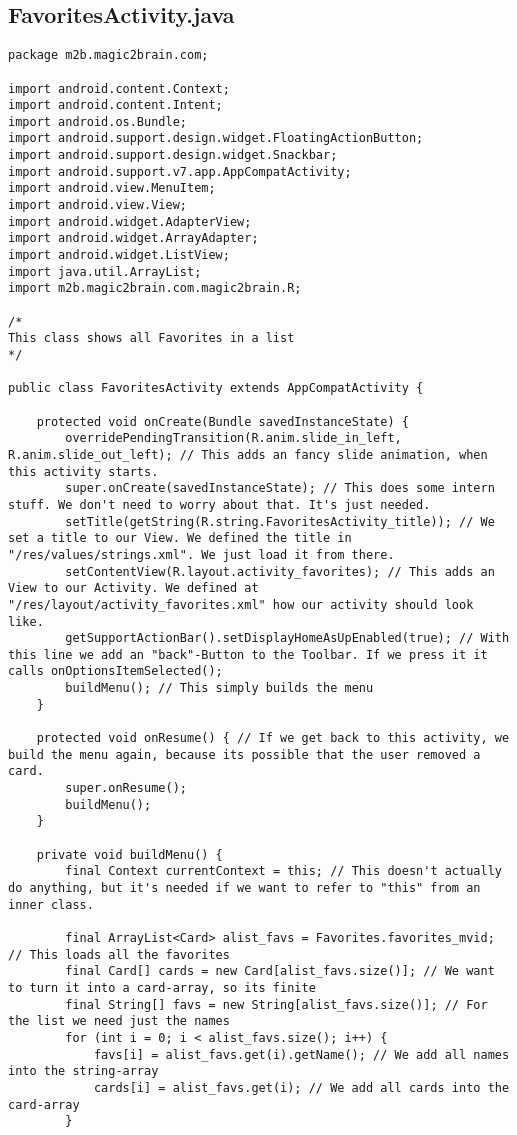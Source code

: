\subsection*{FavoritesActivity.java}
\begin{lstlisting}
package m2b.magic2brain.com;

import android.content.Context;
import android.content.Intent;
import android.os.Bundle;
import android.support.design.widget.FloatingActionButton;
import android.support.design.widget.Snackbar;
import android.support.v7.app.AppCompatActivity;
import android.view.MenuItem;
import android.view.View;
import android.widget.AdapterView;
import android.widget.ArrayAdapter;
import android.widget.ListView;
import java.util.ArrayList;
import m2b.magic2brain.com.magic2brain.R;

/*
This class shows all Favorites in a list
*/

public class FavoritesActivity extends AppCompatActivity {

    protected void onCreate(Bundle savedInstanceState) {
        overridePendingTransition(R.anim.slide_in_left, R.anim.slide_out_left); // This adds an fancy slide animation, when this activity starts.
        super.onCreate(savedInstanceState); // This does some intern stuff. We don't need to worry about that. It's just needed.
        setTitle(getString(R.string.FavoritesActivity_title)); // We set a title to our View. We defined the title in "/res/values/strings.xml". We just load it from there.
        setContentView(R.layout.activity_favorites); // This adds an View to our Activity. We defined at "/res/layout/activity_favorites.xml" how our activity should look like.
        getSupportActionBar().setDisplayHomeAsUpEnabled(true); // With this line we add an "back"-Button to the Toolbar. If we press it it calls onOptionsItemSelected();
        buildMenu(); // This simply builds the menu
    }

    protected void onResume() { // If we get back to this activity, we build the menu again, because its possible that the user removed a card.
        super.onResume();
        buildMenu();
    }

    private void buildMenu() {
        final Context currentContext = this; // This doesn't actually do anything, but it's needed if we want to refer to "this" from an inner class.

        final ArrayList<Card> alist_favs = Favorites.favorites_mvid; // This loads all the favorites
        final Card[] cards = new Card[alist_favs.size()]; // We want to turn it into a card-array, so its finite
        final String[] favs = new String[alist_favs.size()]; // For the list we need just the names
        for (int i = 0; i < alist_favs.size(); i++) {
            favs[i] = alist_favs.get(i).getName(); // We add all names into the string-array
            cards[i] = alist_favs.get(i); // We add all cards into the card-array
        }


\end{lstlisting}
